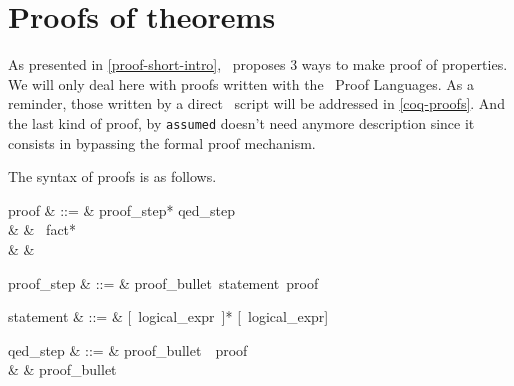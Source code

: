


\section{Proofs of  theorems}
As presented in \ref{proof-short-intro}, \focal\ proposes 3 ways to
make proof of properties. We will only deal here with proofs written
with the \focal\ Proof Languages. As a reminder, those written by a
direct \coq\ script will be addressed in \ref{coq-proofs}. And the
last kind of proof, by {\tt assumed} doesn't need anymore description
since it consists in bypassing the formal proof mechanism.

The syntax of proofs is as follows.
\begin{syntax}
proof & ::=  & proof\_step* qed\_step \\
      & \mid & \ fact* \\
      & \mid & 
\end{syntax}

\begin{syntax}
proof\_step & ::=  & proof\_bullet\ statement\ proof
\end{syntax}

\begin{syntax}
statement & ::=  & [\ logical\_expr\ \terminal{,}]*
                   [\ logical\_expr]
\end{syntax}

\begin{syntax}
qed\_step & ::=  & proof\_bullet\ \ proof \\
          & \mid & proof\_bullet\ 
\end{syntax}

